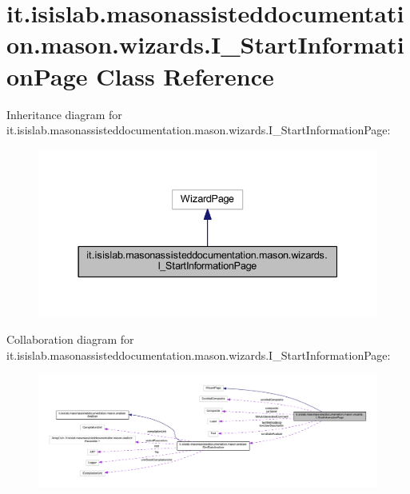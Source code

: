 \hypertarget{classit_1_1isislab_1_1masonassisteddocumentation_1_1mason_1_1wizards_1_1_i___start_information_page}{\section{it.\-isislab.\-masonassisteddocumentation.\-mason.\-wizards.\-I\-\_\-\-Start\-Information\-Page Class Reference}
\label{classit_1_1isislab_1_1masonassisteddocumentation_1_1mason_1_1wizards_1_1_i___start_information_page}
}


Inheritance diagram for it.\-isislab.\-masonassisteddocumentation.\-mason.\-wizards.\-I\-\_\-\-Start\-Information\-Page\-:\nopagebreak
\begin{figure}[H]
\begin{center}
\leavevmode
\includegraphics[width=337pt]{classit_1_1isislab_1_1masonassisteddocumentation_1_1mason_1_1wizards_1_1_i___start_information_page__inherit__graph}
\end{center}
\end{figure}


Collaboration diagram for it.\-isislab.\-masonassisteddocumentation.\-mason.\-wizards.\-I\-\_\-\-Start\-Information\-Page\-:\nopagebreak
\begin{figure}[H]
\begin{center}
\leavevmode
\includegraphics[width=350pt]{classit_1_1isislab_1_1masonassisteddocumentation_1_1mason_1_1wizards_1_1_i___start_information_page__coll__graph}
\end{center}
\end{figure}
